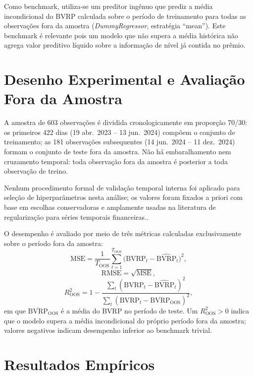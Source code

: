 Como benchmark, utiliza-se um preditor ingênuo que prediz a média incondicional
do BVRP calculada sobre o período de treinamento para todas as observações fora
da amostra (\textit{DummyRegressor}, estratégia ``mean''). Este benchmark
é relevante pois um modelo que não supera a média histórica não agrega valor
preditivo líquido sobre a informação de nível já contida no prêmio.

\section{Desenho Experimental e Avaliação Fora da Amostra}
\label{sec:cap8_oos}

A amostra de 603 observações é dividida cronologicamente em proporção 70/30:
os primeiros 422 dias (19 abr.\ 2023 -- 13 jun.\ 2024) compõem o conjunto de
treinamento; as 181 observações subsequentes (14 jun.\ 2024 -- 11 dez.\ 2024)
formam o conjunto de teste fora da amostra. Não há embaralhamento nem cruzamento
temporal: toda observação fora da amostra é posterior a toda observação de treino.

Nenhum procedimento formal de validação temporal interna foi aplicado para
seleção de hiperparâmetros nesta análise; os valores foram fixados a priori
com base em escolhas conservadoras e amplamente usadas na literatura de
regularização para séries temporais financeiras..

O desempenho é avaliado por meio de três métricas calculadas exclusivamente
sobre o período fora da amostra:
\begin{equation}
\text{MSE} = \frac{1}{T_{\text{OOS}}}\sum_{t=1}^{T_{\text{OOS}}}
\bigl(\text{BVRP}_t - \widehat{\text{BVRP}}_t\bigr)^2,
\end{equation}
\begin{equation}
\text{RMSE} = \sqrt{\text{MSE}},
\end{equation}
\begin{equation}
R^2_{\text{OOS}} = 1 - \frac{\sum_{t}(\text{BVRP}_t - \widehat{\text{BVRP}}_t)^2}
{\sum_{t}(\text{BVRP}_t - \overline{\text{BVRP}}_{\text{OOS}})^2},
\end{equation}
em que $\overline{\text{BVRP}}_{\text{OOS}}$ é a média do BVRP no período de teste.
Um $R^2_{\text{OOS}} > 0$ indica que o modelo supera a média incondicional do
próprio período fora da amostra; valores negativos indicam desempenho inferior ao benchmark trivial.

\section{Resultados Empíricos}
\label{sec:cap8_resultados}

